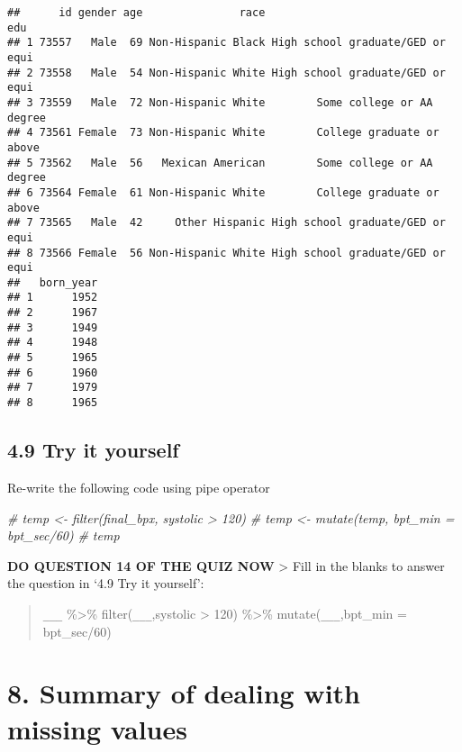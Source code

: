 \documentclass[
]{book}
\newenvironment{Shaded}{\begin{snugshade}}{\end{snugshade}}
\newcommand{\CommentTok}[1]{\textcolor[rgb]{0.56,0.35,0.01}{\textit{#1}}}
\begin{document}
\begin{verbatim}
##      id gender age               race                              edu
## 1 73557   Male  69 Non-Hispanic Black High school graduate/GED or equi
## 2 73558   Male  54 Non-Hispanic White High school graduate/GED or equi
## 3 73559   Male  72 Non-Hispanic White        Some college or AA degree
## 4 73561 Female  73 Non-Hispanic White        College graduate or above
## 5 73562   Male  56   Mexican American        Some college or AA degree
## 6 73564 Female  61 Non-Hispanic White        College graduate or above
## 7 73565   Male  42     Other Hispanic High school graduate/GED or equi
## 8 73566 Female  56 Non-Hispanic White High school graduate/GED or equi
##   born_year
## 1      1952
## 2      1967
## 3      1949
## 4      1948
## 5      1965
## 6      1960
## 7      1979
## 8      1965
\end{verbatim}

\hypertarget{try-it-yourself-22}{%
\subsection{4.9 Try it yourself}\label{try-it-yourself-22}}

Re-write the following code using pipe operator

\begin{Shaded}
\begin{Highlighting}[]
\CommentTok{\# temp \textless{}{-} filter(final\_bpx, systolic \textgreater{} 120)}
\CommentTok{\# temp \textless{}{-} mutate(temp, bpt\_min = bpt\_sec/60)}
\CommentTok{\# temp}
\end{Highlighting}
\end{Shaded}

\textbf{DO QUESTION 14 OF THE QUIZ NOW}
\textgreater{} Fill in the blanks to answer the question in `4.9 Try it yourself':

\begin{quote}
\texttt{\_\_\_} \%\textgreater\%
filter(\texttt{\_\_\_},systolic \textgreater{} 120) \%\textgreater\%
mutate(\texttt{\_\_\_},bpt\_min = bpt\_sec/60)
\end{quote}

\hypertarget{summary-of-dealing-with-missing-values}{%
\section{8. Summary of dealing with missing values}\label{summary-of-dealing-with-missing-values}}
\end{document}

